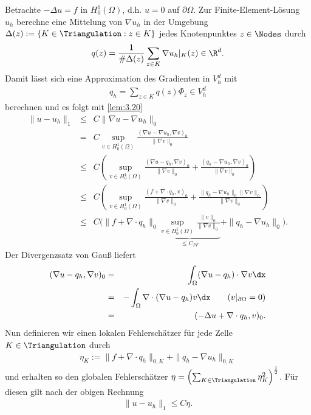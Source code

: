 \begin{Beispiel}
    Betrachte $-\Delta u = f$ in $H_0^1(\Omega)$, d.h. $u = 0$ auf
    $\partial\Omega$.
    Zur Finite-Element-Lösung $u_h$ berechne eine Mittelung von $\nabla u_h$ in der Umgebung
    $\Delta(z) := \{K\in \Triangulation: z\in K\}$ jedes Knotenpunktes $z \in \Nodes$ durch
    \begin{eqnarray*}
        q(z) = \frac{1}{\#\Delta(z)} \sum_{z\in K} \nabla u_h|_K(z) \in \R^d.
    \end{eqnarray*}
    Damit lässt sich eine Approximation des Gradienten in $V_h^d$ mit
    \begin{eqnarray*}
        q_h = \sum_{z\in K} q(z) \Phi_z \in V_h^d
    \end{eqnarray*}
    berechnen und es folgt mit \eqref{lem:3.20}
    \begin{eqnarray*}
              \|u - u_h\|_1
        &\le& C \|\nabla u - \nabla u_h\|_0 \\
        &=& C \sup_{v\in H_0^1(\Omega)}
            \frac{(\nabla u - \nabla u_h, \nabla v)_0}{\|\nabla v\|_0} \\
        &\le& C \left(\sup_{v\in H_0^1(\Omega)}
              \frac{(\nabla u - q_h, \nabla v)_0}{\|\nabla v\|_0} +
              \frac{(q_h - \nabla u_h, \nabla v)_0}{\|\nabla v\|_0}\right) \\
        &\le& C \left(\sup_{v\in H_0^1(\Omega)}
              \frac{(f + \nabla \cdot q_h, v)_0}{\|\nabla v\|_0} +
              \frac{\|q_h - \nabla u_h\|_0 \|\nabla v\|_0}{\|\nabla v\|_0}
              \right) \\
        &\le& C \Bigg(\|f + \nabla \cdot q_h\|_0 \underbrace{\sup_{v\in H_0^1(\Omega)}
              \frac{\|v\|_0}{\|\nabla v\|_0}}_{\le C_{PF}} +
              \|q_h - \nabla u_h\|_0\Bigg).
    \end{eqnarray*}
    Der Divergenzsatz von Gauß liefert
    \begin{eqnarray*}
            (\nabla u - q_h, \nabla v)_0
        &=& \int_\Omega (\nabla u - q_h) \cdot \nabla v \dx \\
        &=& -\int_\Omega \nabla \cdot (\nabla u - q_h) v \dx
            \qquad (v|_{\partial\Omega} = 0) \\
        &=& (-\Delta u +\nabla \cdot q_h, v)_0.
    \end{eqnarray*}
    Nun definieren wir einen lokalen Fehlerschätzer für jede Zelle $K \in \Triangulation$ durch
    \begin{eqnarray*}
        \eta_K := \|f + \nabla \cdot q_h\|_{0,K} + \|q_h - \nabla u_h\|_{0,K}
    \end{eqnarray*}
    und erhalten so den globalen Fehlerschätzer $\eta = \left(\sum_{K\in\Triangulation} \eta_K^2\right)^\frac{1}{2}$. 
    Für diesen gilt nach der obigen Rechnung
    \begin{eqnarray*}
        \|u - u_h\|_1 \le C \eta.
    \end{eqnarray*}
\end{Beispiel}



